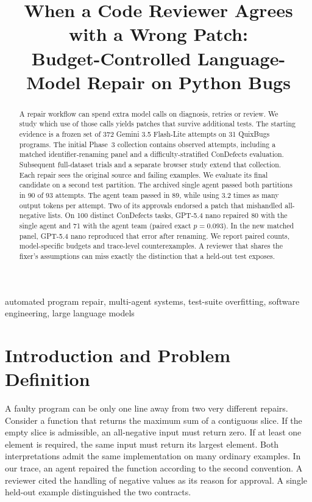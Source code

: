 \documentclass[conference]{IEEEtran}
\title{When a Code Reviewer Agrees with a Wrong Patch:\\Budget-Controlled Language-Model Repair on Python Bugs}
\author{\IEEEauthorblockN{SW403 project research draft for team review}
\IEEEauthorblockA{AI in Modern Software Engineering, Zewail City of Science and Technology\\
Fall 2026 \quad$\cdot$\quad AI assistance and outstanding human review are disclosed in Section~\ref{sec:ethics}}}
\begin{document}
\maketitle
\begin{abstract}
A repair workflow can spend extra model calls on diagnosis, retries or review. We study which use of those calls yields patches that survive additional tests. The starting evidence is a frozen set of 372 Gemini 3.5 Flash-Lite attempts on 31 QuixBugs programs. The initial Phase~3 collection contains \NewAttempts{} observed attempts, including a matched identifier-renaming panel and a difficulty-stratified ConDefects evaluation. Subsequent full-dataset trials and a separate browser study extend that collection. Each repair sees the original source and failing examples. We evaluate its final candidate on a second test partition. The archived single agent passed both partitions in 90 of 93 attempts. The agent team passed in 89, while using 3.2 times as many output tokens per attempt. Two of its approvals endorsed a patch that mishandled all-negative lists. On 100 distinct ConDefects tasks, GPT-5.4 nano repaired 80 with the single agent and 71 with the agent team (paired exact $p=0.093$). In the new matched panel, GPT-5.4 nano reproduced that error after renaming. We report paired counts, model-specific budgets and trace-level counterexamples. A reviewer that shares the fixer's assumptions can miss exactly the distinction that a held-out test exposes.
\end{abstract}
\begin{IEEEkeywords}
automated program repair, multi-agent systems, test-suite overfitting, software engineering, large language models
\end{IEEEkeywords}

\section{Introduction and Problem Definition}
A faulty program can be only one line away from two very different repairs. Consider a function that returns the maximum sum of a contiguous slice. If the empty slice is admissible, an all-negative input must return zero. If at least one element is required, the same input must return its largest element. Both interpretations admit the same implementation on many ordinary examples. In our trace, an agent repaired the function according to the second convention. A reviewer cited the handling of negative values as its reason for approval. A single held-out example distinguished the two contracts.
\end{document}
